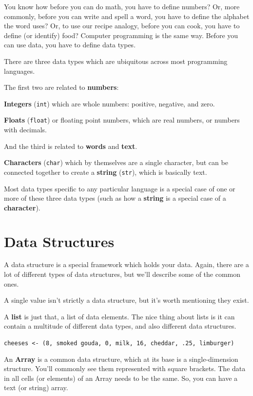 \documentclass[
]{book}
\begin{document}
You know how before you can do math, you have to define numbers? Or, more commonly, before you can write and spell a word, you have to define the alphabet the word uses? Or, to use our recipe analogy, before you can cook, you have to define (or identify) food? Computer programming is the same way. Before you can use data, you have to define data types.

There are three data types which are ubiquitous across most programming languages.

The first two are related to \textbf{numbers}:

\textbf{Integers} (\texttt{int}) which are whole numbers: positive, negative, and zero.

\textbf{Floats} (\texttt{float}) or floating point numbers, which are real numbers, or numbers with decimals.

And the third is related to \textbf{words} and \textbf{text}.

\textbf{Characters} (\texttt{char}) which by themselves are a single character, but can be connected together to create a \textbf{string} (\texttt{str}), which is basically text.

Most data types specific to any particular language is a special case of one or more of these three data types (such as how a \textbf{string} is a special case of a \textbf{character}).

\section{Data Structures}\label{data-structures}

A data structure is a special framework which holds your data. Again, there are a lot of different types of data structures, but we'll describe some of the common ones.

A single value isn't strictly a data structure, but it's worth mentioning they exist.

A \textbf{list} is just that, a list of data elements. The nice thing about lists is it can contain a multitude of different data types, and also different data structures.

\texttt{cheeses\ \textless{}-\ (8,\ smoked\ gouda,\ 0,\ milk,\ 16,\ cheddar,\ .25,\ limburger)}

An \textbf{Array} is a common data structure, which at its base is a single-dimension structure. You'll commonly see them represented with square brackets. The data in all cells (or elements) of an Array needs to be the same. So, you can have a text (or string) array.
\end{document}
